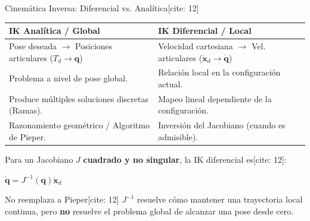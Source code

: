 \documentclass[aspectratio=169, xcolor={table,xcdraw}]{beamer}
\begin{document}
\begin{frame}{Cinemática Inversa: Diferencial vs. Analítica[cite: 12]}
    \begin{center}
        \renewcommand{\arraystretch}{1.2}
        \footnotesize
        \begin{tabular}{|p{}|p{}|}
        \hline
        \rowcolor{gray!20}\textbf{IK Analítica / Global} & \textbf{IK Diferencial / Local} \\ \hline
        Pose deseada $\to$ Posiciones articulares ($T_d \to \mathbf{q}$) & Velocidad cartesiana $\to$ Vel. articulares ($\dot{\mathbf{x}}_d \to \dot{\mathbf{q}}$) \\ \hline
        Problema a nivel de pose global. & Relación local en la configuración actual. \\ \hline
        Produce múltiples soluciones discretas (Ramas). & Mapeo lineal dependiente de la configuración. \\ \hline
        Razonamiento geométrico / Algoritmo de Pieper. & Inversión del Jacobiano (cuando es admisible). \\ \hline
        \end{tabular}
    \end{center}
    
    \vfill
    Para un Jacobiano $J$ \textbf{cuadrado y no singular}, la IK diferencial es[cite: 12]:
    \begin{center}
        $\boxed{\dot{\mathbf{q}} = J^{-1}(\mathbf{q})\dot{\mathbf{x}}_d}$
    \end{center}
    
    \vfill
    \begin{alertblock}{No reemplaza a Pieper[cite: 12]}
        \footnotesize $J^{-1}$ resuelve cómo mantener una trayectoria local continua, pero \textbf{no} resuelve el problema global de alcanzar una pose desde cero.
    \end{alertblock}
\end{frame}
\end{document}

